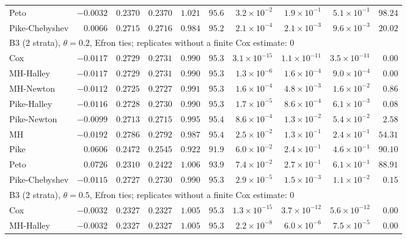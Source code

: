 \begin{landscape}
\begin{longtable}{lrrrrrrrrr}
Peto & $-0.0032$ & $0.2370$ & $0.2370$ & $1.021$ & $95.6$ & $3.2 \times 10^{-2}$ & $1.9 \times 10^{-1}$ & $5.1 \times 10^{-1}$ & $98.24$ \\
Pike-Chebyshev & $0.0066$ & $0.2715$ & $0.2716$ & $0.984$ & $95.2$ & $2.1 \times 10^{-4}$ & $2.1 \times 10^{-3}$ & $9.6 \times 10^{-3}$ & $20.02$ \\
\multicolumn{10}{l}{B3 (2 strata), $\theta = 0.2$, Efron ties; replicates without a finite Cox estimate: 0} \\
Cox & $-0.0117$ & $0.2729$ & $0.2731$ & $0.990$ & $95.3$ & $3.1 \times 10^{-15}$ & $1.1 \times 10^{-11}$ & $3.5 \times 10^{-11}$ & $0.00$ \\
MH-Halley & $-0.0117$ & $0.2729$ & $0.2731$ & $0.990$ & $95.3$ & $1.3 \times 10^{-6}$ & $1.6 \times 10^{-4}$ & $9.0 \times 10^{-4}$ & $0.00$ \\
MH-Newton & $-0.0112$ & $0.2725$ & $0.2727$ & $0.991$ & $95.3$ & $1.6 \times 10^{-4}$ & $4.8 \times 10^{-3}$ & $1.6 \times 10^{-2}$ & $0.86$ \\
Pike-Halley & $-0.0116$ & $0.2728$ & $0.2730$ & $0.990$ & $95.3$ & $1.7 \times 10^{-5}$ & $8.6 \times 10^{-4}$ & $6.1 \times 10^{-3}$ & $0.08$ \\
Pike-Newton & $-0.0099$ & $0.2713$ & $0.2715$ & $0.995$ & $95.4$ & $8.6 \times 10^{-4}$ & $1.3 \times 10^{-2}$ & $5.4 \times 10^{-2}$ & $2.58$ \\
MH & $-0.0192$ & $0.2786$ & $0.2792$ & $0.987$ & $95.4$ & $2.5 \times 10^{-2}$ & $1.3 \times 10^{-1}$ & $2.4 \times 10^{-1}$ & $54.31$ \\
Pike & $0.0606$ & $0.2472$ & $0.2545$ & $0.922$ & $91.9$ & $6.0 \times 10^{-2}$ & $2.4 \times 10^{-1}$ & $4.6 \times 10^{-1}$ & $90.10$ \\
Peto & $0.0726$ & $0.2310$ & $0.2422$ & $1.006$ & $93.9$ & $7.4 \times 10^{-2}$ & $2.7 \times 10^{-1}$ & $6.1 \times 10^{-1}$ & $88.91$ \\
Pike-Chebyshev & $-0.0115$ & $0.2727$ & $0.2730$ & $0.990$ & $95.3$ & $2.9 \times 10^{-5}$ & $1.5 \times 10^{-3}$ & $1.1 \times 10^{-2}$ & $0.15$ \\
\multicolumn{10}{l}{B3 (2 strata), $\theta = 0.5$, Efron ties; replicates without a finite Cox estimate: 0} \\
Cox & $-0.0032$ & $0.2327$ & $0.2327$ & $1.005$ & $95.3$ & $1.3 \times 10^{-15}$ & $3.7 \times 10^{-12}$ & $5.6 \times 10^{-12}$ & $0.00$ \\
MH-Halley & $-0.0032$ & $0.2327$ & $0.2327$ & $1.005$ & $95.3$ & $2.2 \times 10^{-8}$ & $6.0 \times 10^{-6}$ & $7.5 \times 10^{-5}$ & $0.00$ \\

\end{longtable}
\end{landscape}
